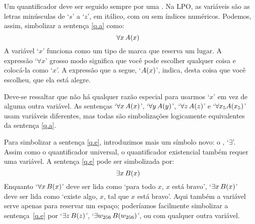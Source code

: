 
Um quantificador deve ser seguido sempre por uma .
Na LPO, as variáveis são as letras minúsculas de `$s$' a `$z$', em itálico, com ou sem índices numéricos.
Podemos, assim, simbolizar a sentença \ref{q.a} como:
$$\forall x\, \mathord{A}(x)$$
A variável `$x$' funciona como um tipo de marca que reserva um lugar.
A expressão `$\forall x$' grosso modo significa que você pode escolher qualquer coisa e colocá-la como `$x$'.
A expressão que a segue, `$\mathord{A}(x)$', indica, desta coisa que você escolheu,  que ela está alegre.


Deve-se ressaltar que não há qualquer razão especial para usarmos `$x$' em vez de alguma outra variável.
As sentenças `$\forall x\, \mathord{A}(x)$', `$\forall y\, \mathord{A}(y)$', `$\forall z\, \mathord{A}(z)$' e `$\forall x_5 \mathord{A}(x_5)$' usam variáveis diferentes, mas todas são simbolizações logicamente equivalentes da sentença \ref{q.a}.

Para simbolizar a sentença \ref{q.e}, introduzimos mais um símbolo novo: o , `$\exists$'.
Assim como o quantificador universal, o quantificador existencial também requer uma variável.
A sentença \ref{q.e} pode ser simbolizada por:
$$\exists x\,\mathord{B}(x)$$
Enquanto `$\forall x\,\mathord{B}(x)$' deve ser lida como `para todo $x$, $x$ está bravo', `$\exists x\,\mathord{B}(x)$' deve ser lida como `existe algo, $x$, tal que $x$ está bravo'.
Aqui também a variável serve apenas para reservar um espaço; poderíamos facilmente simbolizar a sentença~\ref{q.e} por `$\exists z\, \mathord{B}(z)$', `$\exists w_{256}\, \mathord{B}(w_{256})$', ou com qualquer outra variável.


